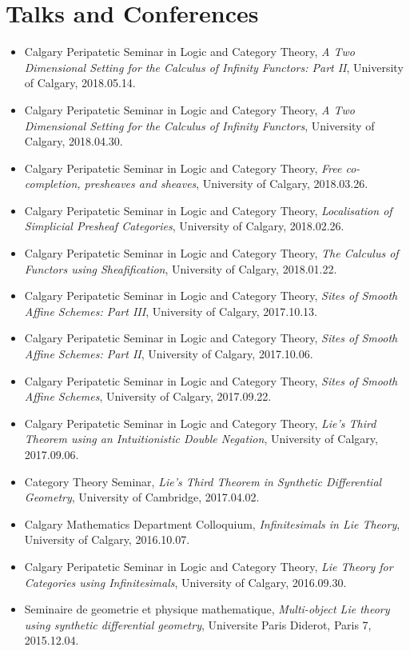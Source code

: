 \documentclass[10pt]{article}
\begin{document}
\section*{Talks and Conferences}
\begin{itemize}
    \item Calgary Peripatetic Seminar in Logic and Category Theory, \emph{A Two Dimensional Setting for the Calculus of Infinity Functors: Part II}, University of Calgary, 2018.05.14.
    \item Calgary Peripatetic Seminar in Logic and Category Theory, \emph{A Two Dimensional Setting for the Calculus of Infinity Functors}, University of Calgary, 2018.04.30.
    \item Calgary Peripatetic Seminar in Logic and Category Theory, \emph{Free co-completion, presheaves and sheaves}, University of Calgary, 2018.03.26.
    \item Calgary Peripatetic Seminar in Logic and Category Theory, \emph{Localisation of Simplicial Presheaf Categories}, University of Calgary, 2018.02.26.
    \item Calgary Peripatetic Seminar in Logic and Category Theory, \emph{The Calculus of Functors using Sheafification}, University of Calgary, 2018.01.22.
    \item Calgary Peripatetic Seminar in Logic and Category Theory, \emph{Sites of Smooth Affine Schemes: Part III}, University of Calgary, 2017.10.13.
    \item Calgary Peripatetic Seminar in Logic and Category Theory, \emph{Sites of Smooth Affine Schemes: Part II}, University of Calgary, 2017.10.06.
    \item Calgary Peripatetic Seminar in Logic and Category Theory, \emph{Sites of Smooth Affine Schemes}, University of Calgary, 2017.09.22.
    \item  Calgary Peripatetic Seminar in Logic and Category Theory, \emph{Lie's Third Theorem using an Intuitionistic Double Negation}, University of Calgary, 2017.09.06.
    \item Category Theory Seminar, \emph{Lie's Third Theorem in Synthetic Differential Geometry},  University of Cambridge, 2017.04.02.
    \item Calgary Mathematics Department Colloquium, \emph{Infinitesimals in Lie Theory}, University of Calgary, 2016.10.07.
    \item Calgary Peripatetic Seminar in Logic and Category Theory, \emph{Lie Theory for Categories using Infinitesimals}, University of Calgary, 2016.09.30.
    \item Seminaire de geometrie et physique mathematique, \emph{Multi-object Lie theory using synthetic differential geometry}, Universite Paris Diderot, Paris 7, 2015.12.04.

\end{itemize}
\end{document}
